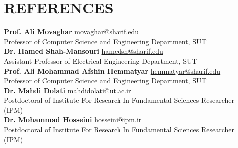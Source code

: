\documentclass[11pt]{article}
\begin{document}
\section{REFERENCES}

\textbf{Prof. Ali Movaghar} \href{https://scholar.google.com/citations?user=BXNelwwAAAAJ\&hl=en}{\small \faExternalLink} \hfill \href{mailto:movaghar@sharif.edu}{movaghar@sharif.edu}\\
Professor of Computer Science and Engineering Department, SUT \\
\textbf{Dr. Hamed Shah-Mansouri} \href{https://scholar.google.com/citations?user=dcjIFccAAAAJ&hl=en&oi=ao}{\small \faExternalLink} \hfill  \href{mailto:hamedsh@sharif.edu}{hamedsh@sharif.edu}\\
Assistant Professor of Electrical Engineering Department, SUT\\
\textbf{Prof. Ali Mohammad Afshin Hemmatyar} \href{https://scholar.google.com/citations?user=wob0AskAAAAJ&hl=en&oi=ao}{\small \faExternalLink}  \hfill \href{mailto:hemmatyar@sharif.edu}{hemmatyar@sharif.edu}\\
Professor of Computer Science and Engineering Department, SUT\\
\textbf{Dr. Mahdi Dolati} \href{https://scholar.google.com/citations?user=b7A2CXYAAAAJ&hl=en&oi=ao}{\small \faExternalLink} \hfill  \href{mailto:mahdidolati@ut.ac.ir}{mahdidolati@ut.ac.ir}\\ Postdoctoral of Institute For Research In Fundamental Sciences Researcher (IPM)\\
\textbf{Dr. Mohammad Hosseini} \href{https://scholar.google.com/citations?user=iRO-DVoAAAAJ&hl=en&oi=ao}{\small \faExternalLink} \hfill  \href{mailto:hosseini@ipm.ir}{hosseini@ipm.ir} \\ Postdoctoral of Institute For Research In Fundamental Sciences Researcher (IPM)\\\\\\\\
\end{document}
